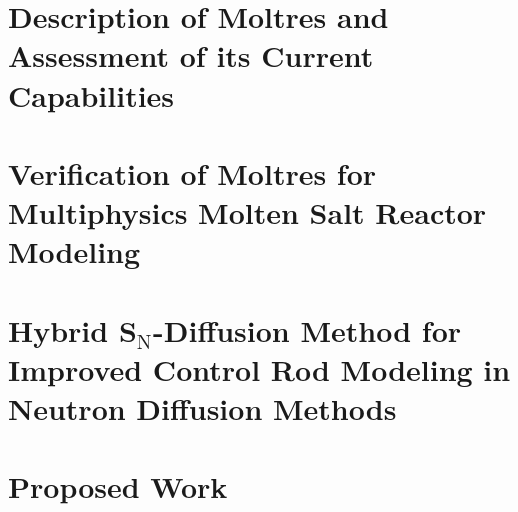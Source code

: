 \documentclass[edeposit,fullpage,12pt]{uiucthesis2021}
\begin{document}
\chapter{Description of Moltres and Assessment of its Current Capabilities}
\label{chap:moltres}

\glsresetall

\chapter{Verification of Moltres for Multiphysics Molten Salt
Reactor Modeling}
\label{chap:benchmark}

\glsresetall

\chapter{Hybrid S$_\text{N}$-Diffusion Method for Improved Control Rod Modeling
in Neutron Diffusion Methods}
\label{chap:hybrid}

\glsresetall

\chapter{Proposed Work}
\label{chap:proposedwork}

\glsresetall

\backmatter



\end{document}
